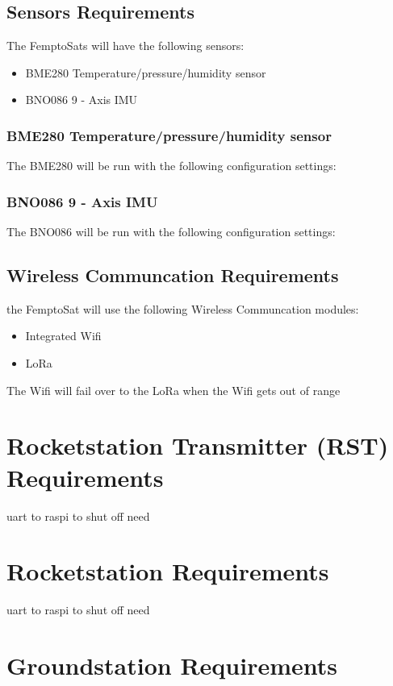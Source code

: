 \documentclass{book}
\begin{document}
\subsection{Sensors Requirements}
\par The FemptoSats will have the following sensors: 
\begin{itemize}
    \item BME280 Temperature/pressure/humidity sensor
    \item BNO086 9 - Axis IMU
\end{itemize}

\subsubsection{BME280 Temperature/pressure/humidity sensor}
\par The BME280 will be run with the following configuration settings: 

\subsubsection{BNO086 9 - Axis IMU}
\par The BNO086 will be run with the following configuration settings:

\subsection{Wireless Communcation Requirements}
\par the FemptoSat will use the following Wireless Communcation modules:
\begin{itemize}
    \item Integrated Wifi
    \item LoRa
\end{itemize}
\par The Wifi will fail over to the LoRa when the Wifi gets out of range

\section{Rocketstation Transmitter (RST) Requirements}
\par uart to raspi to shut off need

\section{Rocketstation Requirements}
\par uart to raspi to shut off need
\section{Groundstation Requirements}





%

%
%
\end{document}
